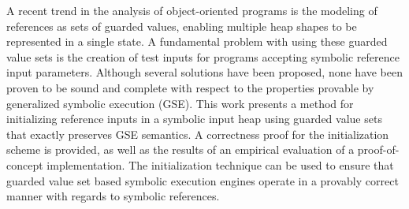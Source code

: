 A recent trend in the analysis of object-oriented programs is the
modeling of references as sets of guarded values, enabling multiple
heap shapes to be represented in a single state. A fundamental problem
with using these guarded value sets is the creation of test inputs for
programs accepting symbolic reference input parameters. Although
several solutions have been proposed, none have been proven to be
sound and complete with respect to the properties provable by
generalized symbolic execution (GSE). This work presents a method for
initializing reference inputs in a symbolic input heap using guarded
value sets that exactly preserves GSE semantics. A correctness proof
for the initialization scheme is provided, as well as the results of
an empirical evaluation of a proof-of-concept implementation. The
initialization technique can be used to ensure that guarded value set
based symbolic execution engines operate in a provably correct manner
with regards to symbolic references.



